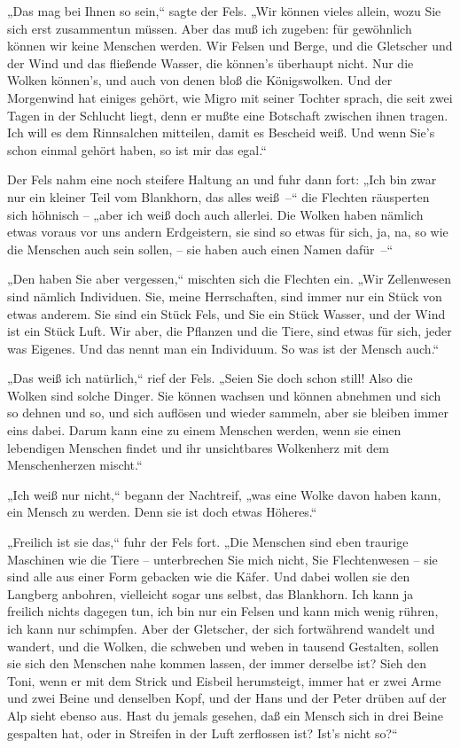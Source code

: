 „Das mag bei Ihnen so sein,“ sagte der Fels. „Wir können vieles
allein, wozu Sie sich erst zusammentun müssen. Aber das muß ich
zugeben: für gewöhnlich können wir keine Menschen werden. Wir
Felsen und Berge, und die Gletscher und der Wind und das fließende
Wasser, die können's überhaupt nicht. Nur die Wolken können's, und
auch von denen bloß die Königswolken. Und der Morgenwind hat
einiges gehört, wie Migro mit seiner Tochter sprach, die seit zwei
Tagen in der Schlucht liegt, denn er mußte eine Botschaft zwischen
ihnen tragen. Ich will es dem Rinnsalchen mitteilen, damit es
Bescheid weiß. Und wenn Sie's schon einmal gehört haben, so ist mir
das egal.“

Der Fels nahm eine noch steifere Haltung an und fuhr dann fort:
„Ich bin zwar nur ein kleiner Teil vom Blankhorn, das alles weiß~–“
die Flechten räusperten sich höhnisch – „aber ich weiß doch auch
allerlei. Die Wolken haben nämlich etwas voraus vor uns andern
Erdgeistern, sie sind so etwas für sich, ja, na, so wie die
Menschen auch sein sollen, – sie haben auch einen Namen dafür~–“

„Den haben Sie aber vergessen,“ mischten sich die Flechten ein.
„Wir Zellenwesen sind nämlich Individuen. Sie, meine Herrschaften,
sind immer nur ein Stück von etwas anderem. Sie sind ein Stück
Fels, und Sie ein Stück Wasser, und der Wind ist ein Stück Luft.
Wir aber, die Pflanzen und die Tiere, sind etwas für sich, jeder
was Eigenes. Und das nennt man ein Individuum. So was ist der
Mensch auch.“

„Das weiß ich natürlich,“ rief der Fels. „Seien Sie doch schon
still! Also die Wolken sind solche Dinger. Sie können wachsen und
können abnehmen und sich so dehnen und so, und sich auflösen und
wieder sammeln, aber sie bleiben immer eins dabei. Darum kann eine
zu einem Menschen werden, wenn sie einen lebendigen Menschen findet
und ihr unsichtbares Wolkenherz mit dem Menschenherzen mischt.“

„Ich weiß nur nicht,“ begann der Nachtreif, „was eine Wolke davon
haben kann, ein Mensch zu werden. Denn sie ist doch etwas
Höheres.“

„Freilich ist sie das,“ fuhr der Fels fort. „Die Menschen sind eben
traurige Maschinen wie die Tiere – unterbrechen Sie mich nicht, Sie
Flechtenwesen – sie sind alle aus einer Form gebacken wie die
Käfer. Und dabei wollen sie den Langberg anbohren, vielleicht sogar
uns selbst, das Blankhorn. Ich kann ja freilich nichts dagegen tun,
ich bin nur ein Felsen und kann mich wenig rühren, ich kann nur
schimpfen. Aber der Gletscher, der sich fortwährend wandelt und
wandert, und die Wolken, die schweben und weben in tausend
Gestalten, sollen sie sich den Menschen nahe kommen lassen, der
immer derselbe ist? Sieh den Toni, wenn er mit dem Strick und
Eisbeil herumsteigt, immer hat er zwei Arme und zwei Beine und
denselben Kopf, und der Hans und der Peter drüben auf der Alp sieht
ebenso aus. Hast du jemals gesehen, daß ein Mensch sich in drei
Beine gespalten hat, oder in Streifen in der Luft zerflossen ist?
Ist's nicht so?“

